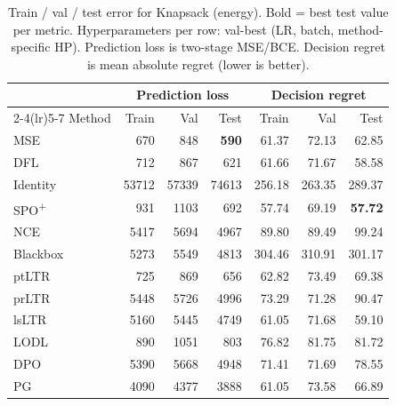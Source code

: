 \begin{table}[t]
\centering
\caption[Train/val/test error for Knapsack (energy).]{Train / val / test error for Knapsack (energy). Bold = best test value per metric. Hyperparameters per row: val-best (LR, batch, method-specific HP). Prediction loss is two-stage MSE/BCE. Decision regret is mean absolute regret (lower is better).}
\label{tab:err-knapsack-real}
\setlength{\tabcolsep}{4pt}
\renewcommand{\arraystretch}{1.05}
\begin{tabular}{@{}lrrrrrr@{}}
\toprule
& \multicolumn{3}{c}{Prediction loss} & \multicolumn{3}{c}{Decision regret} \\
\cmidrule(lr){2-4}\cmidrule(lr){5-7}
Method & Train & Val & Test & Train & Val & Test \\
\midrule
MSE & 670 & 848 & \textbf{590} & 61.37 & 72.13 & 62.85 \\
DFL & 712 & 867 & 621 & 61.66 & 71.67 & 58.58 \\
Identity & 53712 & 57339 & 74613 & 256.18 & 263.35 & 289.37 \\
SPO\textsuperscript{+} & 931 & 1103 & 692 & 57.74 & 69.19 & \textbf{57.72} \\
NCE & 5417 & 5694 & 4967 & 89.80 & 89.49 & 99.24 \\
Blackbox & 5273 & 5549 & 4813 & 304.46 & 310.91 & 301.17 \\
ptLTR & 725 & 869 & 656 & 62.82 & 73.49 & 69.38 \\
prLTR & 5448 & 5726 & 4996 & 73.29 & 71.28 & 90.47 \\
lsLTR & 5160 & 5445 & 4749 & 61.05 & 71.68 & 59.10 \\
LODL & 890 & 1051 & 803 & 76.82 & 81.75 & 81.72 \\
DPO & 5390 & 5668 & 4948 & 71.41 & 71.69 & 78.55 \\
PG & 4090 & 4377 & 3888 & 61.05 & 73.58 & 66.89 \\
\bottomrule
\end{tabular}
\end{table}

